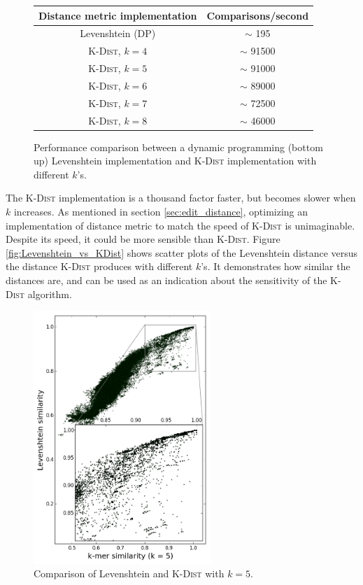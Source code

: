 \begin{figure}[H]   \centering   \begin{tabular}{ c | c }     Distance metric
implementation              & Comparisons/second      \\     \hline \hline
Levenshtein (DP)                      & $\sim$ 195              \\     \hline
\textsc{K-Dist}, $k=4$                & $\sim$ 91500            \\     \hline
\textsc{K-Dist}, $k=5$                & $\sim$ 91000            \\     \hline
\textsc{K-Dist}, $k=6$                & $\sim$ 89000            \\     \hline
\textsc{K-Dist}, $k=7$                & $\sim$ 72500            \\     \hline
\textsc{K-Dist}, $k=8$                & $\sim$ 46000            \\
\end{tabular}   \caption{Performance comparison between a dynamic programming
(bottom up) Levenshtein implementation and \textsc{K-Dist} implementation with
different $k$'s.}   \label{fig:levenshtein_vs_kdist_performance} \end{figure}
The \textsc{K-Dist} implementation is a thousand factor faster, but becomes
slower when $k$ increases. As mentioned in section \ref{sec:edit_distance},
optimizing an implementation of distance metric to match the speed of
\textsc{K-Dist} is unimaginable. Despite its speed, it could be more sensible
than \textsc{K-Dist}. Figure \ref{fig:Levenshtein_vs_KDist} shows scatter
plots of the Levenshtein distance versus the distance \textsc{K-Dist} produces
with different $k$'s. It demonstrates how similar the distances are, and can
be used as an indication about the sensitivity of the \textsc{K-Dist}
algorithm.


\begin{figure}
  \includegraphics[width=0.6\textwidth]{graphics/Levenshtein_K-Dist_k5.png}
  \caption{Comparison of Levenshtein and \textsc{K-Dist} with $k=5$.}
\end{figure}

